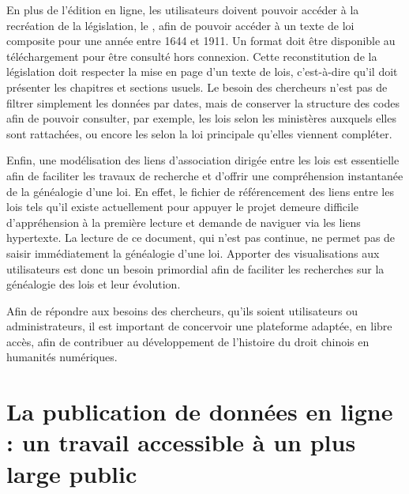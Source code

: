En plus de l'édition en ligne, les utilisateurs doivent pouvoir accéder à la recréation de la législation, le \cv, afin de pouvoir accéder à un texte de loi composite pour une année entre 1644 et 1911. Un format \pdf doit être disponible au téléchargement pour être consulté hors connexion. Cette reconstitution de la législation doit respecter la mise en page d'un texte de lois, c'est-à-dire qu'il doit présenter les chapitres et sections usuels. Le besoin des chercheurs n'est pas de filtrer simplement les données par dates, mais de conserver la structure des codes afin de pouvoir consulter, par exemple, les lois selon les ministères auxquels elles sont rattachées, ou encore les \li selon la loi principale qu'elles viennent compléter. 

Enfin, une modélisation des liens d'association dirigée entre les lois est essentielle afin de faciliter les travaux de recherche et d'offrir une compréhension instantanée de la généalogie d'une loi. En effet, le fichier de référencement des liens entre les lois tels qu'il existe actuellement pour appuyer le projet demeure difficile d'appréhension à la première lecture et demande de naviguer via les liens hypertexte. La lecture de ce document, qui n'est pas continue, ne permet pas de saisir immédiatement la généalogie d'une loi. Apporter des visualisations aux utilisateurs est donc un besoin primordial afin de faciliter les recherches sur la généalogie des lois et leur évolution. 

Afin de répondre aux besoins des chercheurs, qu'ils soient utilisateurs ou administrateurs, il est important de concervoir une plateforme adaptée, en libre accès, afin de contribuer au développement de l'histoire du droit chinois en humanités numériques.

 \section{La publication de données en ligne : un travail accessible à un plus large public}
